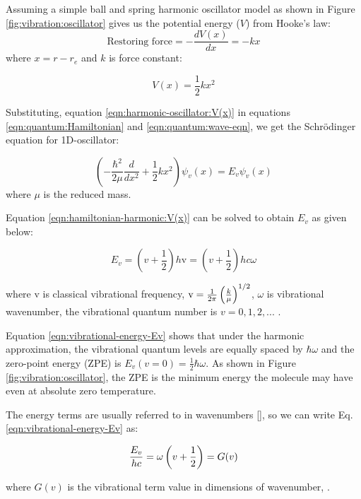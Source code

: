 Assuming a simple ball and spring harmonic oscillator model as shown in Figure \ref{fig:vibration:oscillator} gives us the potential energy ($V$) from Hooke's law:
\[\text{Restoring force} = - \frac{dV(x)}{dx} = -kx\]
where $x=r-r_e$ and $k$ is force constant:

\begin{equation}
    \label{eqn:harmonic-oscillator:V(x)}
    V(x) = \frac{1}{2} k x^2
\end{equation}

Substituting, equation \ref{eqn:harmonic-oscillator:V(x)} in equations \ref{eqn:quantum:Hamiltonian} and \ref{eqn:quantum:wave-eqn}, we get the Schr\"odinger equation for 1D-oscillator:

\begin{equation}
    \label{eqn:hamiltonian-harmonic:V(x)}
    \left( -\frac{\hbar^2}{2\mu} \frac{d}{d x^2} + \frac{1}{2} k x^2 \right ) \psi_v(x) = E_v\psi_v(x)
\end{equation}
where $\mu$ is the reduced mass.

Equation \ref{eqn:hamiltonian-harmonic:V(x)} can be solved to obtain $E_v$ as given below:

\begin{equation}
    \label{eqn:vibrational-energy-Ev}
    E_v = \left( v + \frac{1}{2} \right) h \text{v} = \left( v + \frac{1}{2} \right) hc\omega
\end{equation}

where v is classical vibrational frequency, $\text{v}=\frac{1}{2\pi}\left( \frac{k}{\mu} \right)^{1/2}$, $\omega$ is vibrational wavenumber, the vibrational quantum number is $v=0, 1, 2, ...$ .


Equation \ref{eqn:vibrational-energy-Ev} shows that under the harmonic approximation, the vibrational quantum levels are equally spaced by $\hbar\omega$ and the zero-point energy (ZPE) is $E_v(v=0)=\frac{1}{2}\hbar\omega$. As shown in Figure \ref{fig:vibration:oscillator}, the ZPE is the minimum energy the molecule may have even at absolute zero temperature.

The energy terms are usually referred to in wavenumbers [\wn], so we can write Eq. \ref{eqn:vibrational-energy-Ev} as:

\begin{equation}
    \label{eqn:Ev-Gv}
    \frac{E_v}{hc} = \omega \left( v + \frac{1}{2} \right) = G(v)
\end{equation}

where $G(v)$ is the vibrational term value in dimensions of wavenumber, \wn.

